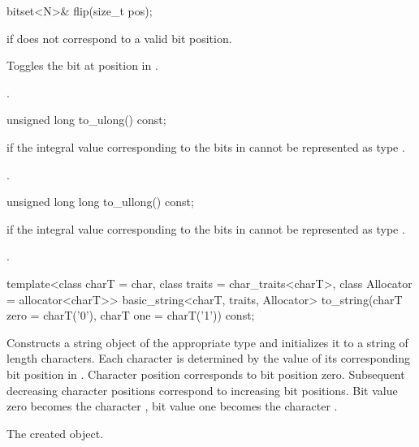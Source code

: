 %
\begin{itemdecl}
bitset<N>& flip(size_t pos);
\end{itemdecl}

\begin{itemdescr}
\pnum
\throws
{}
if  does not correspond to a valid bit position.%

\pnum
\effects
Toggles the bit at position  in
.

\pnum
\returns
{}.
\end{itemdescr}

%
\begin{itemdecl}
unsigned long to_ulong() const;
\end{itemdecl}

\begin{itemdescr}
\pnum
\throws
{}%
if the integral value  corresponding to the bits in
cannot be represented as type
.

\pnum
\returns
{}.
\end{itemdescr}

%
\begin{itemdecl}
unsigned long long to_ullong() const;
\end{itemdecl}

\begin{itemdescr}
\pnum
{}%
\throws
{}
if the integral value  corresponding to the bits in
cannot be represented as type
.

\pnum
\returns
{}.
\end{itemdescr}

%
\begin{itemdecl}
template<class charT = char,
          class traits = char_traits<charT>,
          class Allocator = allocator<charT>>
  basic_string<charT, traits, Allocator>
    to_string(charT zero = charT('0'), charT one = charT('1')) const;
\end{itemdecl}

\begin{itemdescr}
\pnum
\effects
Constructs a string object of the appropriate type
and initializes it to a string of length  characters.
Each character is determined by the value of its corresponding bit position in
.
Character position  corresponds to bit position zero.
Subsequent decreasing character positions correspond to increasing bit
positions.
Bit value zero becomes the character ,
bit value one becomes the character
.

\pnum
\returns
The created object.
\end{itemdescr}

